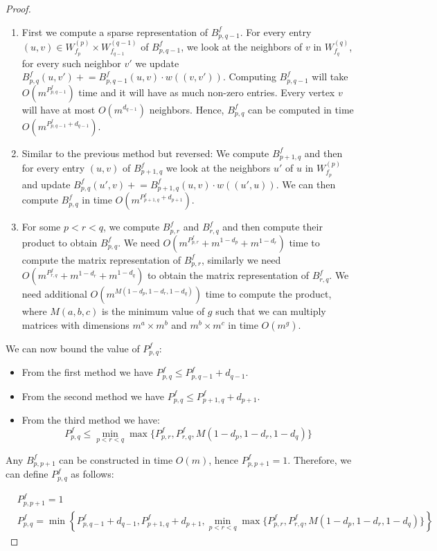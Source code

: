 \documentclass[a4paper,UKenglish,cleveref, autoref, numberwithinsect, thm-restate]{lipics-v2021}
\begin{document}
\begin{proof}
			\begin{enumerate}
				\item First we compute a sparse representation of $B^f_{p,q-1}$. For every entry $(u,v) \in W^{(p)}_{f_p} \times W^{(q-1)}_{f_{q-1}}$ of $B^f_{p,q-1}$, we look at the neighbors of $v$ in $W^{(q)}_{f_{q}}$, for every such neighbor $v'$ we update $B^f_{p,q}(u,v') +\!\!= B^f_{p,q-1}(u,v) \cdot w((v,v'))$. Computing $B^f_{p,q-1}$ will take $O(m^{P^f_{p,q-1}})$ time and it will have as much non-zero entries. Every vertex $v$ will have at most $O(m^{d_{q-1}})$ neighbors. Hence, $B^f_{p,q}$ can be computed in time $O(m^{P^f_{p,q-1} + d_{q-1}})$.
				\item Similar to the previous method but reversed: We compute $B^f_{p+1,q}$ and then for every entry $(u,v)$ of $B^f_{p+1,q}$ we look at the neighbors $u'$ of $u$ in $W^{(p)}_{f_{p}}$ and update $B^f_{p,q}(u',v) +\!\!= B^f_{p+1,q}(u,v) \cdot w((u',u))$. We can then compute $B^f_{p,q}$ in time $O(m^{P^f_{p+1,q} + d_{p+1}})$.
				\item For some $p < r < q$, we compute $B^f_{p,r}$ and $B^f_{r,q}$ and then compute their product to obtain $B^f_{p,q}$. We need $O(m^{P^f_{p,r}} + m^{1-d_p} + m^{1-d_r})$ time to compute the matrix representation of $B^f_{p,r}$, similarly we need $O(m^{P^f_{r,q}} + m^{1-d_r} + m^{1-d_q})$ to obtain the matrix representation of $B^f_{r,q}$. We need additional $O(m^{M(1-d_p,1-d_r,1-d_q)})$ time to compute the product, where $M(a,b,c)$ is the minimum value of $g$ such that we can multiply matrices with dimensions $m^a \times m^b$ and $m^b \times m^c$ in time $O(m^g)$.
			\end{enumerate}
			
			We can now bound the value of $P^f_{p,q}$:
			\begin{itemize}
				\item From the first method we have $P^f_{p,q} \leq P^f_{p,q-1} + d_{q-1}$.
				\item From the second method we have $P^f_{p,q} \leq P^f_{p+1,q} + d_{p+1}$.
				\item From the third method we have: 
				\[P^f_{p,q} \leq \min_{p<r<q}\max \{P^f_{p,r},P^f_{r,q}, M(1-d_p,1-d_r,1-d_q)\}\]
			\end{itemize}
			
			Any $B^f_{p,p+1}$ can be constructed in time $O(m)$, hence $P^f_{p,p+1}=1$. Therefore, we can define $P^f_{p,q}$ as follows:
			
			\begin{equation} \label{eq:cycle1}
			\begin{split}
				& P^f_{p,p+1}=1 \\
				& P^f_{p,q} = \min\left\{ P^f_{p,q-1} + d_{q-1}, P^f_{p+1,q} + d_{p+1}, \min_{p<r<q}\max \{P^f_{p,r},P^f_{r,q}, M(1-d_p,1-d_r,1-d_q)\}    \right\}
			\end{split}
			\end{equation}
			

\end{proof}
\end{document}
